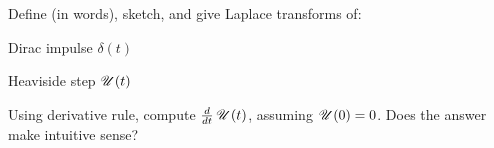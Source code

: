     \begin{question}
      \begin{fullwidth}
        Define (in words), sketch, and give Laplace transforms of:
        \begin{colenumerate}
        \item Dirac impulse \(\delta(t)\)
        \item Heaviside step \(\operatorname{\mathscr{U}}(t)\)
        \end{colenumerate}
      \end{fullwidth}
    \solspace{.25in}

    \noindent Using derivative rule, compute \(\frac{d}{dt}\operatorname{\mathscr{U}}(t)\), assuming \(\operatorname{\mathscr{U}}(0) = 0\). Does the answer make intuitive sense?
    \solspace{0.25in}
    \end{question}

